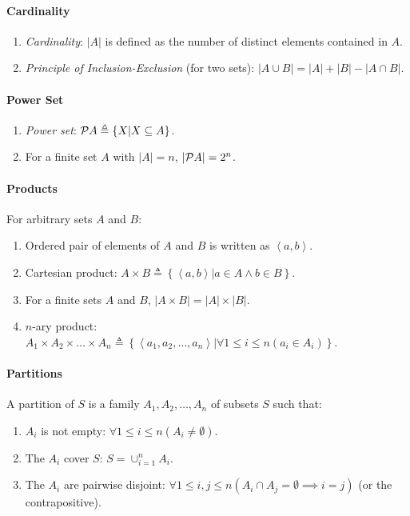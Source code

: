 \documentclass[10pt,twoside,twocolumn]{article}
\begin{document}
\paragraph{Cardinality}
\begin{enumerate}
\item \emph{Cardinality}: $\left|A\right|$ is defined as the number of
distinct elements contained in $A$.
\item \emph{Principle of Inclusion-Exclusion} (for two sets): $\left|A\cup B\right|=\left|A\right|+\left|B\right|-\left|A\cap B\right|$.
\end{enumerate}

\paragraph{Power Set}
\begin{enumerate}
\item \emph{Power set}: ${\cal P}A\triangleq\left\{ X|X\subseteq A\right\} $.
\item For a finite set $A$ with $\left|A\right|=n$, $\left|{\cal P}A\right|=2^{n}$.
\end{enumerate}

\paragraph{Products}

For arbitrary sets $A$ and $B$:
\begin{enumerate}
\item Ordered pair of elements of $A$ and $B$ is written as $\left\langle a,b\right\rangle $.
\item Cartesian product: $A\times B\triangleq\left\{ \left\langle a,b\right\rangle |a\in A\land b\in B\right\} $.
\item For a finite sets $A$ and $B$, $\left|A\times B\right|=\left|A\right|\times\left|B\right|$.
\item $n$-ary product: $A_{1}\times A_{2}\times\dots\times A_{n}\triangleq\left\{ \left\langle a_{1},a_{2},\dots,a_{n}\right\rangle |\forall1\leq i\leq n\left(a_{i}\in A_{i}\right)\right\} $.
\end{enumerate}

\paragraph{Partitions}

A partition of $S$ is a family $A_{1},A_{2},\dots,A_{n}$ of subsets
$S$ such that:
\begin{enumerate}
\item \noindent $A_{i}$ is not empty: $\forall1\leq i\leq n\left(A_{i}\neq\emptyset\right)$.
\item The $A_{i}$ cover $S$: $S=\cup_{i=1}^{n}A_{i}$.
\item The $A_{i}$ are pairwise disjoint: $\forall1\leq i,j\leq n\left(A_{i}\cap A_{j}=\emptyset\implies i=j\right)$
(or the contrapositive).
\end{enumerate}
\end{document}
